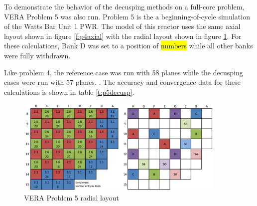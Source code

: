 \begin{table}
\centering
\caption{VERA Problem 4 Decusping Results}\label{t:p4decusp}
\end{table}


To demonstrate the behavior of the decusping methods on a full-core problem, VERA Problem 5 was also run.  Problem 5 is the a beginning-of-cycle simulation of the Watts Bar Unit 1 PWR.  The model of this reactor uses the same axial layout shown in figure \ref{f:p4axial} with the radial layout shown in figure \ref{f:p5radial}.  For these calculations, Bank D was set to a position of \hl{numbers} while all other banks were fully withdrawn.

Like problem 4, the reference case was run with 58 planes while the decusping cases were run with 57 planes.  .  The accuracy and convergence data for these calculations is shown in table \ref{t:p5decusp}.

\begin{figure}
\centering
\includegraphics[width=0.9\textwidth]{figs/WB1-cycle1-layout.png}
\caption{VERA Problem 5 radial layout}\label{f:p5radial}
\end{figure}

